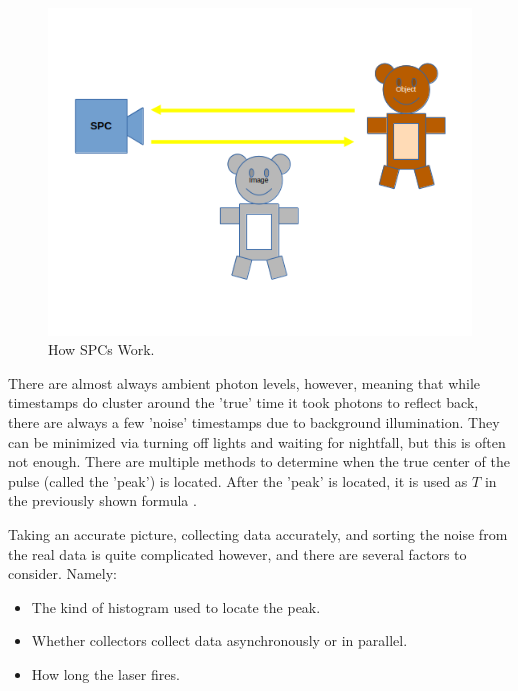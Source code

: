 \documentclass{beamer}
\begin{document}
\begin{frame}
  \begin{figure}[H]
    \centering
    \includegraphics[width=1\linewidth]{SPCExplained.png}
    \caption{\label{fig:Data}How SPCs Work.}
  \end{figure}
\end{frame}

\begin{frame}  
  There are almost always ambient photon levels, however, meaning that while timestamps do cluster around the 'true' time it took photons to reflect back, there are always a few 'noise' timestamps due to background illumination. They can be minimized via turning off lights and waiting for nightfall, but this is often not enough. There are multiple methods to determine when the true center of the pulse (called the 'peak') is located. After the 'peak' is located, it is used as $T$ in the previously shown formula \cite{sadekar}.
\end{frame}

\begin{frame}
  Taking an accurate picture, collecting data accurately, and sorting the noise from the real data is quite complicated however, and there are several factors to consider. Namely:
  \begin{itemize}
  \item The kind of histogram used to locate the peak.
  \item Whether collectors collect data asynchronously or in parallel.
  \item How long the laser fires.
  \end{itemize}
\end{frame}
\end{document}
